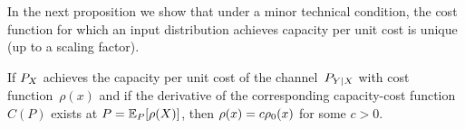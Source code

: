 %

In the next proposition we show that under a minor technical condition, the cost
function for which an input distribution achieves capacity per unit cost is
unique (up to a scaling factor).

\begin{proposition}
  \label{prop:cucconverse}
  If $P_X$ achieves the capacity per unit cost of the channel~$P_{Y|X}$ with cost
  function~$\rho(x)$ and if the derivative of the corresponding capacity-cost
  function $C(P)$ exists at $P = \mathbb{E}_P[\rho(X)]$, then $\rho(x) = c {\rho_0}(x)$ for
  some $c>0$.
\end{proposition}

